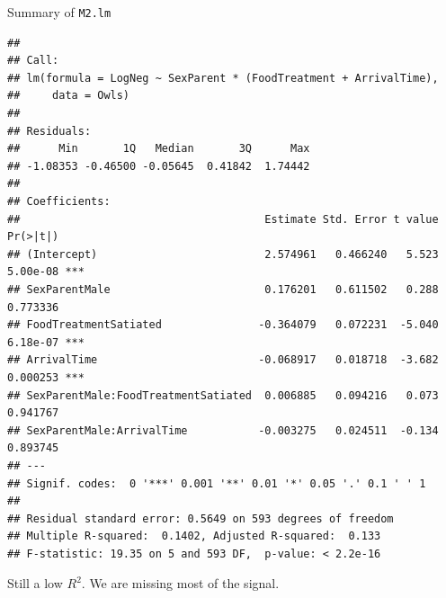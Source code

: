 \documentclass[
  ignorenonframetext,
]{beamer}
\begin{document}
\begin{frame}[fragile]{Summary of \texttt{M2.lm}}
\protect\hypertarget{summary-of-m2.lm}{}
\tiny

\begin{verbatim}
## 
## Call:
## lm(formula = LogNeg ~ SexParent * (FoodTreatment + ArrivalTime), 
##     data = Owls)
## 
## Residuals:
##      Min       1Q   Median       3Q      Max 
## -1.08353 -0.46500 -0.05645  0.41842  1.74442 
## 
## Coefficients:
##                                      Estimate Std. Error t value Pr(>|t|)    
## (Intercept)                          2.574961   0.466240   5.523 5.00e-08 ***
## SexParentMale                        0.176201   0.611502   0.288 0.773336    
## FoodTreatmentSatiated               -0.364079   0.072231  -5.040 6.18e-07 ***
## ArrivalTime                         -0.068917   0.018718  -3.682 0.000253 ***
## SexParentMale:FoodTreatmentSatiated  0.006885   0.094216   0.073 0.941767    
## SexParentMale:ArrivalTime           -0.003275   0.024511  -0.134 0.893745    
## ---
## Signif. codes:  0 '***' 0.001 '**' 0.01 '*' 0.05 '.' 0.1 ' ' 1
## 
## Residual standard error: 0.5649 on 593 degrees of freedom
## Multiple R-squared:  0.1402, Adjusted R-squared:  0.133 
## F-statistic: 19.35 on 5 and 593 DF,  p-value: < 2.2e-16
\end{verbatim}

\normalsize

Still a low \(R^2\). We are missing most of the signal.
\end{frame}
\end{document}
